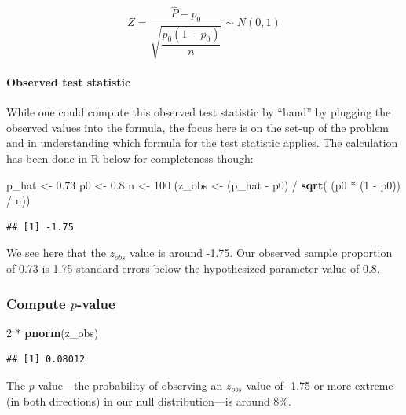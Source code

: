 \documentclass[]{tufte-book}
\newenvironment{Shaded}{\begin{snugshade}}{\end{snugshade}}
\newcommand{\KeywordTok}[1]{\textcolor[rgb]{0.13,0.29,0.53}{\textbf{{#1}}}}
\newcommand{\DecValTok}[1]{\textcolor[rgb]{0.00,0.00,0.81}{{#1}}}
\newcommand{\FloatTok}[1]{\textcolor[rgb]{0.00,0.00,0.81}{{#1}}}
\newcommand{\StringTok}[1]{\textcolor[rgb]{0.31,0.60,0.02}{{#1}}}
\newcommand{\NormalTok}[1]{{#1}}
\theoremstyle{definition}
\theoremstyle{definition}
\theoremstyle{remark}
\begin{document}
\[ Z =\dfrac{ \hat{P} - p_0}{\sqrt{\dfrac{p_0(1 - p_0)}{n} }} \sim N(0, 1) \]

\paragraph{Observed test statistic}\label{observed-test-statistic-1}

While one could compute this observed test statistic by ``hand'' by
plugging the observed values into the formula, the focus here is on the
set-up of the problem and in understanding which formula for the test
statistic applies. The calculation has been done in R below for
completeness though:

\begin{Shaded}
\begin{Highlighting}[]
\NormalTok{p_hat <-}\StringTok{ }\FloatTok{0.73}
\NormalTok{p0 <-}\StringTok{ }\FloatTok{0.8}
\NormalTok{n <-}\StringTok{ }\DecValTok{100}
\NormalTok{(z_obs <-}\StringTok{ }\NormalTok{(p_hat -}\StringTok{ }\NormalTok{p0) /}\StringTok{ }\KeywordTok{sqrt}\NormalTok{( (p0 *}\StringTok{ }\NormalTok{(}\DecValTok{1} \NormalTok{-}\StringTok{ }\NormalTok{p0)) /}\StringTok{ }\NormalTok{n))}
\end{Highlighting}
\end{Shaded}

\begin{verbatim}
## [1] -1.75
\end{verbatim}

We see here that the \(z_{obs}\) value is around -1.75. Our observed
sample proportion of 0.73 is 1.75 standard errors below the hypothesized
parameter value of 0.8.

\subsubsection{\texorpdfstring{Compute
\(p\)-value}{Compute p-value}}\label{compute-p-value-1}

\begin{Shaded}
\begin{Highlighting}[]
\DecValTok{2} \NormalTok{*}\StringTok{ }\KeywordTok{pnorm}\NormalTok{(z_obs)}
\end{Highlighting}
\end{Shaded}

\begin{verbatim}
## [1] 0.08012
\end{verbatim}

The \(p\)-value---the probability of observing an \(z_{obs}\) value of
-1.75 or more extreme (in both directions) in our null distribution---is
around 8\%.
\end{document}
